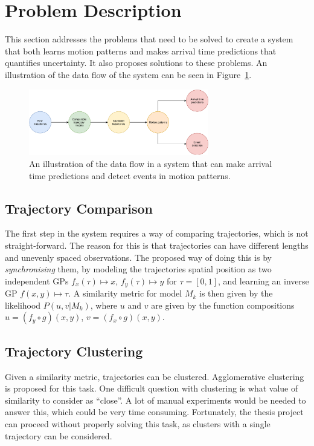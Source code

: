 \section{Problem Description}
This section addresses the problems that need to be solved to create a
system that both learns motion patterns and makes arrival
time predictions that quantifies uncertainty. It also proposes
solutions to these problems. An illustration of the data flow of the
system can be seen in Figure~\ref{fig:system-subproblems}.
\begin{figure}[H]
  \centering
  \includegraphics[width=0.7\textwidth]{figures/system-subproblems}
  \caption{An illustration of the data flow in a system that can make
    arrival time predictions and detect events in motion patterns.}\label{fig:system-subproblems}
\end{figure}

\subsection{Trajectory Comparison}
The first step in the system requires a way of comparing
trajectories, which is not straight-forward. The reason for this is that trajectories
can have different lengths and unevenly spaced observations.
The proposed way of doing this is by \textit{synchronising} them,
by modeling the trajectories spatial position as two independent GPs \(f_x(\tau) \mapsto
x\), \(f_y(\tau) \mapsto y\) for $\tau = [0,1]$, and learning an
inverse GP \(f(x, y) \mapsto \tau\). A similarity
metric for model \(M_k\) is then given by the likelihood \(P(u, v | M_k)\), where
$u$ and $v$ are given by the function compositions \(u = (f_{y} \circ g)(x, y)\),
\(v = (f_{x} \circ g)(x, y)\).


\subsection{Trajectory Clustering}
Given a similarity metric, trajectories can be
clustered. Agglomerative clustering is proposed for this task.
One difficult question with clustering is what value of similarity to consider
as ``close''. A lot of manual experiments would be needed to
answer this, which could be very time consuming. Fortunately, the thesis
project can proceed without properly solving this task, as clusters
with a single trajectory can be considered.

